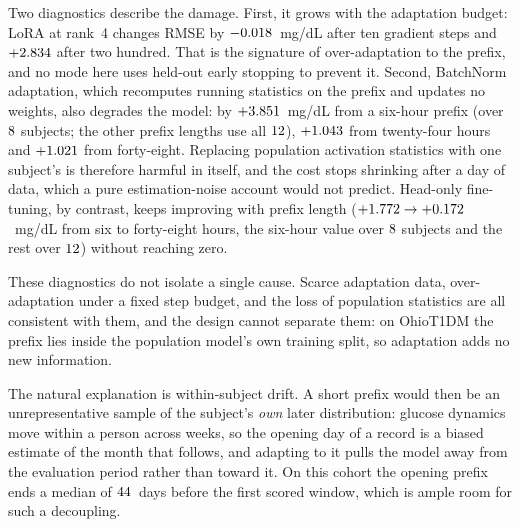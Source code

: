 Two diagnostics describe the damage. First, it grows with the adaptation
budget: LoRA at rank~4 changes RMSE by $-0.018$~mg/dL after
ten gradient steps and $+2.834$ after two hundred.
That is the signature of over-adaptation to the prefix, and no mode here uses
held-out early stopping to prevent it. Second, BatchNorm adaptation, which
recomputes running statistics on the prefix and updates no weights, also
degrades the model: by $+3.851$~mg/dL from a six-hour prefix
(over $8$ subjects; the other prefix lengths use all
$12$),
$+1.043$ from twenty-four hours and
$+1.021$ from forty-eight. Replacing population
activation statistics with one subject's is therefore harmful in itself, and the
cost stops shrinking after a day of data, which a pure estimation-noise account
would not predict. Head-only fine-tuning, by contrast, keeps improving with
prefix length ($+1.772 \to
+0.172$~mg/dL from six to forty-eight hours, the
six-hour value over $8$ subjects and the rest over
$12$) without reaching zero.

These diagnostics do not isolate a single cause. Scarce adaptation data,
over-adaptation under a fixed step budget, and the loss of population
statistics are all consistent with them, and the design cannot separate them:
on OhioT1DM the prefix lies inside the population model's own training split, so
adaptation adds no new information.




The natural explanation is within-subject drift. A short prefix would then be an
unrepresentative sample of the subject's \emph{own} later distribution: glucose
dynamics move within a person across weeks, so the opening day of a record is a
biased estimate of the month that follows, and adapting to it pulls the model
away from the evaluation period rather than toward it. On this cohort the
opening prefix ends a median of $44$~days before the first
scored window, which is ample room for such a decoupling.

